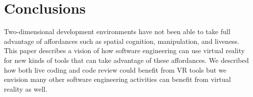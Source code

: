 \documentclass[conference]{IEEEtran}
\begin{document}
\section{Conclusions}

Two-dimensional development environments have not been able to take full advantage of affordances such as spatial cognition, manipulation, and liveness.
This paper describes a vision of how software engineering can use virtual reality for new kinds of tools that can take advantage of these affordances.
We described how both live coding and code review could benefit from VR tools but we envision many other software engineering activities can benefit from virtual reality as well.





\end{document}
